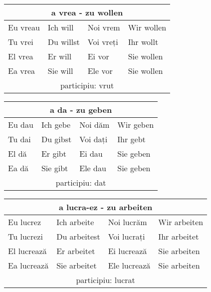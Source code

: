 \documentclass[11pt, oneside]{article}
\begin{document}
%
\begin{center}
  \begin{tabular}{ |p{3.25cm}|p{3.25cm}||p{3.25cm}|p{3.25cm}| }
      \hline
      \multicolumn{4}{|c|}{a vrea - zu wollen} \\
      \hline
      \hline
      Eu vreau & Ich will & Noi vrem & Wir wollen\\
      \hline
      Tu vrei & Du willst & Voi vreți & Ihr wollt\\
      \hline
      El vrea & Er will & Ei vor & Sie wollen\\ 
      Ea vrea & Sie will & Ele vor & Sie wollen\\
      \hline
      \multicolumn{4}{|c|}{participiu: vrut} \\
      \hline
     \end{tabular}
\end{center}
%
\begin{center}
  \begin{tabular}{ |p{3.25cm}|p{3.25cm}||p{3.25cm}|p{3.25cm}| }
      \hline
      \multicolumn{4}{|c|}{a da - zu geben} \\
      \hline
      \hline
      Eu dau & Ich gebe & Noi dăm & Wir geben\\
      \hline
      Tu dai & Du gibst & Voi dați & Ihr gebt\\
      \hline
      El dă & Er gibt & Ei dau & Sie geben\\ 
      Ea dă & Sie gibt & Ele dau & Sie geben\\
      \hline
      \multicolumn{4}{|c|}{participiu: dat} \\
      \hline
     \end{tabular}
\end{center}
%
\begin{center}
  \begin{tabular}{ |p{3.25cm}|p{3.25cm}||p{3.25cm}|p{3.25cm}| }
      \hline
      \multicolumn{4}{|c|}{a lucra-ez - zu arbeiten} \\
      \hline
      \hline
      Eu lucrez & Ich arbeite & Noi lucrăm & Wir arbeiten\\
      \hline
      Tu lucrezi & Du arbeitest & Voi lucrați & Ihr arbeitet\\
      \hline
      El lucrează & Er arbeitet & Ei lucrează & Sie arbeiten\\ 
      Ea lucrează & Sie arbeitet & Ele lucrează & Sie arbeiten\\
      \hline
      \multicolumn{4}{|c|}{participiu: lucrat} \\
      \hline
     \end{tabular}
\end{center}
\end{document}
